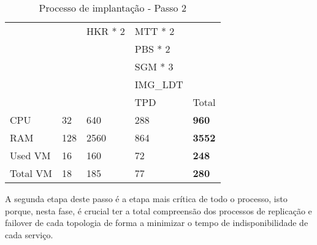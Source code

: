 \begin{table}[H]
\begin{tabular}{|l|l|l|l|l|}
                                     &                                             & \cellcolor[HTML]{A9D08E}HKR * 2              & \cellcolor[HTML]{BDD7EE}MTT * 2              &                              \\ \cline{4-4}
                                     &                                             &                                              & \cellcolor[HTML]{BDD7EE}PBS * 2              &                              \\ \cline{4-4}
                                     &                                             &                                              & \cellcolor[HTML]{BDD7EE}SGM * 3              &                              \\ \cline{4-4}
                                     &                                             &                                              & \cellcolor[HTML]{BDD7EE}IMG\_LDT                  & \\ \cline{4-4}
                                     &                                             &                                              & \cellcolor[HTML]{BDD7EE}TPD                  & Total                        \\ \cline{1-5}
    \cellcolor[HTML]{C0C0C0}CPU      & 32                                          & 640                                          & 288                                          & \textbf{960}                 \\ \cline{1-5}
    \cellcolor[HTML]{C0C0C0}RAM      & 128                                         & 2560                                         & 864                                          & \textbf{3552}                \\ \cline{1-5}
    \cellcolor[HTML]{C0C0C0}Used VM  & 16                                          & 160                                          & 72                                           & \textbf{248}                 \\ \cline{1-5}
    \cellcolor[HTML]{C0C0C0}Total VM & 18                                          & 185                                          & 77                                           & \textbf{280}                 \\ \cline{1-5}
  \end{tabular}
  \caption{Processo de implantação - Passo 2}
  \label{tab:strat-2}
\end{table}

A segunda etapa deste passo é a etapa mais crítica de todo o processo, isto porque, nesta fase, é
crucial ter a total compreensão dos processos de replicação e \gls{failover} de cada topologia de
forma a minimizar o tempo de indisponibilidade de cada serviço.

